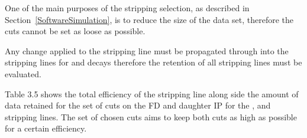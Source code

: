 One of the main purposes of the stripping selection, as described in Section~\ref{SoftwareSimulation}, is to reduce the size of the data set, therefore the cuts cannot be set as loose as possible. 

Any change applied to the \bmumu stripping line must be propagated through into the stripping lines for \bhh and \bujpsik decays therefore the retention of all stripping lines must be evaluated.

Table 3.5 %
shows the total efficiency of the \bsmumu stripping line along side the amount of data retained for the set of cuts on the FD \chisqd and daughter IP \chisqd for the \bmumu, \bhh and \bujpsik stripping lines. The set of chosen cuts aims to keep both cuts as high as possible for a certain \bsmumu efficiency. 



